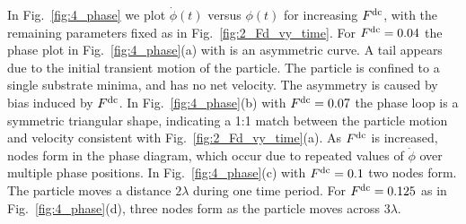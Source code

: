 \documentclass[preprint,showpacs,preprintnumbers,amsmath,amssymb,aps,prb]{revtex4-1}
\theoremstyle{remark}
\begin{document}
  In Fig.~\ref{fig:4_phase}
  we plot $\dot{\phi}(t)$ versus $\phi(t)$
  for increasing 
  $F^{\rm dc}$, 
  with the remaining parameters fixed as in Fig.~\ref{fig:2_Fd_vy_time}.
  For
  $F^{\rm dc} = 0.04$
  the phase plot   in Fig.~\ref{fig:4_phase}(a) with is an
  asymmetric curve.
  A tail appears
  due to the initial transient
  motion of the particle.
  The particle is confined to a single
  substrate minima,
  and has no net velocity.
  The asymmetry is caused by bias induced by $F^{\rm dc}$.
  In Fig.~\ref{fig:4_phase}(b)
  with $F^{\rm dc} = 0.07$
  the phase loop is a symmetric triangular shape,
  indicating a 1:1 match between the
  particle motion and velocity consistent with 
  Fig.~\ref{fig:2_Fd_vy_time}(a).
  As $F^{\rm dc}$ is
  increased,
  nodes form in the phase diagram, which
   occur due to repeated values
  of $\dot{\phi}$ over multiple phase positions.
  In Fig.~\ref{fig:4_phase}(c)
  with $F^{\rm dc} = 0.1$
  two nodes form.
  The particle moves a distance $2\lambda$
  during one time period.
For $F^{\rm dc} = 0.125$ as in Fig.~\ref{fig:4_phase}(d),
  three nodes form as the particle moves across $3\lambda$.
  
\end{document}
